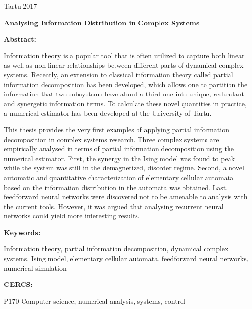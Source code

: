 \documentclass[12pt]{article}
\begin{document}
\vfill
\centerline{Tartu 2017}



\newpage 
\noindent\textbf{\large Analysing Information Distribution in Complex Systems}

\vspace*{3ex}

\noindent\textbf{Abstract:} 

\noindent
Information theory is a popular tool that is often utilized to capture both linear as well as non-linear relationships between different parts of dynamical complex systems. Recently, an extension to classical information theory called partial information decomposition has been developed, which allows one to partition the information that two subsystems have about a third one into unique, redundant and synergetic information terms. To calculate these novel quantities in practice, a numerical estimator has been developed at the University of Tartu. 

This thesis provides the very first examples of applying partial information decomposition in complex systems research. Three complex systems are empirically analysed in terms of partial information decomposition using the numerical estimator. First, the synergy in the Ising model was found to peak while the system was still in the demagnetized, disorder regime. Second, a novel automatic and quantitative characterization of elementary cellular automata based on the information distribution in the automata was obtained. Last, feedforward neural networks were discovered not to be amenable to analysis with the current tools. However, it was argued that analysing recurrent neural networks could yield more interesting results. 

\vspace*{1ex}

\noindent\textbf{Keywords:} 

Information theory, partial information decomposition, dynamical complex systems, Ising model, elementary cellular automata, feedforward neural networks, numerical simulation

\vspace*{1ex}

\noindent\textbf{CERCS:} 

P170 Computer science, numerical analysis, systems, control

\vspace*{3ex}
\end{document}
